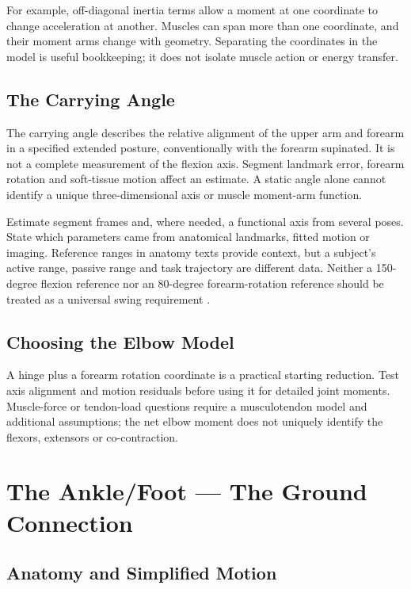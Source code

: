 For example, off-diagonal inertia terms allow a moment at one coordinate to change acceleration at another. Muscles can span more than one coordinate, and their moment arms change with geometry. Separating the coordinates in the model is useful bookkeeping; it does not isolate muscle action or energy transfer.

\subsection{The Carrying Angle}\label{the-carrying-angle}

The carrying angle describes the relative alignment of the upper arm and forearm in a specified extended posture, conventionally with the forearm supinated. It is not a complete measurement of the flexion axis. Segment landmark error, forearm rotation and soft-tissue motion affect an estimate. A static angle alone cannot identify a unique three-dimensional axis or muscle moment-arm function.

Estimate segment frames and, where needed, a functional axis from several poses. State which parameters came from anatomical landmarks, fitted motion or imaging. Reference ranges in anatomy texts provide context, but a subject's active range, passive range and task trajectory are different data. Neither a 150-degree flexion reference nor an 80-degree forearm-rotation reference should be treated as a universal swing requirement \citep{Neumann2017}.

\subsection{Choosing the Elbow Model}\label{choosing-the-elbow-model}

A hinge plus a forearm rotation coordinate is a practical starting reduction. Test axis alignment and motion residuals before using it for detailed joint moments. Muscle-force or tendon-load questions require a musculotendon model and additional assumptions; the net elbow moment does not uniquely identify the flexors, extensors or co-contraction.

\section{The Ankle/Foot --- The Ground Connection}\label{sec-ankle_foot}\label{sec:ankle_foot}

\subsection{Anatomy and Simplified Motion}\label{anatomy-and-simplified-motion}


